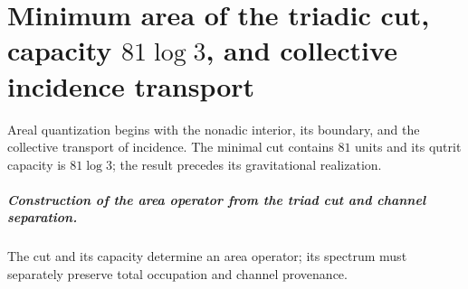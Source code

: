 \chapter{Minimum area of the triadic cut, capacity \texorpdfstring{\(81\log 3\)}{81 log 3}, and collective incidence transport}
\label{chap:parte-iv-58}

Areal quantization begins with the nonadic interior, its boundary, and the collective transport of incidence. The minimal cut contains \(81\) units and its qutrit capacity is \(81\log 3\); the result precedes its gravitational realization.



\paragraph{Construction of the area operator from the triad cut and channel separation.} The cut and its capacity determine an area operator; its spectrum must separately preserve total occupation and channel provenance.
